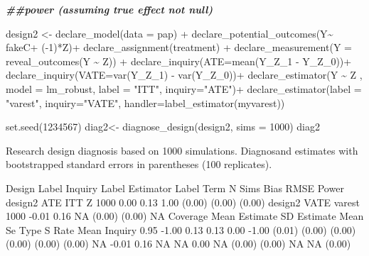 \documentclass[
  11pt,
]{article}
\newenvironment{Shaded}{\begin{snugshade}}{\end{snugshade}}
\newcommand{\AttributeTok}[1]{\textcolor[rgb]{0.77,0.63,0.00}{#1}}
\newcommand{\DecValTok}[1]{\textcolor[rgb]{0.00,0.00,0.81}{#1}}
\newcommand{\DocumentationTok}[1]{\textcolor[rgb]{0.56,0.35,0.01}{\textbf{\textit{#1}}}}
\newcommand{\FunctionTok}[1]{\textcolor[rgb]{0.00,0.00,0.00}{#1}}
\newcommand{\NormalTok}[1]{#1}
\newcommand{\OtherTok}[1]{\textcolor[rgb]{0.56,0.35,0.01}{#1}}
\newcommand{\SpecialCharTok}[1]{\textcolor[rgb]{0.00,0.00,0.00}{#1}}
\newcommand{\StringTok}[1]{\textcolor[rgb]{0.31,0.60,0.02}{#1}}
\begin{document}
\begin{Shaded}
\begin{Highlighting}[]
\DocumentationTok{\#\#power (assuming true effect not null)}

\NormalTok{design2  }\OtherTok{\textless{}{-}}
  \FunctionTok{declare\_model}\NormalTok{(}\AttributeTok{data =}\NormalTok{ pap) }\SpecialCharTok{+}
  \FunctionTok{declare\_potential\_outcomes}\NormalTok{(Y}\SpecialCharTok{\textasciitilde{}}\NormalTok{ fakeC}\SpecialCharTok{+}\NormalTok{ (}\SpecialCharTok{{-}}\DecValTok{1}\NormalTok{)}\SpecialCharTok{*}\NormalTok{Z)}\SpecialCharTok{+}
  \FunctionTok{declare\_assignment}\NormalTok{(treatment) }\SpecialCharTok{+} 
  \FunctionTok{declare\_measurement}\NormalTok{(}\AttributeTok{Y =} \FunctionTok{reveal\_outcomes}\NormalTok{(Y }\SpecialCharTok{\textasciitilde{}}\NormalTok{ Z)) }\SpecialCharTok{+}
  \FunctionTok{declare\_inquiry}\NormalTok{(}\AttributeTok{ATE=}\FunctionTok{mean}\NormalTok{(Y\_Z\_1 }\SpecialCharTok{{-}}\NormalTok{ Y\_Z\_0))}\SpecialCharTok{+}
  \FunctionTok{declare\_inquiry}\NormalTok{(}\AttributeTok{VATE=}\FunctionTok{var}\NormalTok{(Y\_Z\_1) }\SpecialCharTok{{-}} \FunctionTok{var}\NormalTok{(Y\_Z\_0))}\SpecialCharTok{+}
  \FunctionTok{declare\_estimator}\NormalTok{(Y }\SpecialCharTok{\textasciitilde{}}\NormalTok{ Z , }\AttributeTok{model =}\NormalTok{ lm\_robust, }\AttributeTok{label =} \StringTok{"ITT"}\NormalTok{, }\AttributeTok{inquiry=}\StringTok{"ATE"}\NormalTok{)}\SpecialCharTok{+}
  \FunctionTok{declare\_estimator}\NormalTok{(}\AttributeTok{label =} \StringTok{"varest"}\NormalTok{, }\AttributeTok{inquiry=}\StringTok{"VATE"}\NormalTok{, }\AttributeTok{handler=}\FunctionTok{label\_estimator}\NormalTok{(myvarest)) }

\FunctionTok{set.seed}\NormalTok{(}\DecValTok{1234567}\NormalTok{)}
\NormalTok{diag2}\OtherTok{\textless{}{-}} \FunctionTok{diagnose\_design}\NormalTok{(design2, }\AttributeTok{sims =} \DecValTok{1000}\NormalTok{)}
\NormalTok{diag2}
\end{Highlighting}
\end{Shaded}

Research design diagnosis based on 1000 simulations. Diagnosand
estimates with bootstrapped standard errors in parentheses (100
replicates).

Design Label Inquiry Label Estimator Label Term N Sims Bias RMSE Power
design2 ATE ITT Z 1000 0.00 0.13 1.00 (0.00) (0.00) (0.00) design2 VATE
varest 1000 -0.01 0.16 NA (0.00) (0.00) NA Coverage Mean Estimate SD
Estimate Mean Se Type S Rate Mean Inquiry 0.95 -1.00 0.13 0.13 0.00
-1.00 (0.01) (0.00) (0.00) (0.00) (0.00) (0.00) NA -0.01 0.16 NA NA 0.00
NA (0.00) (0.00) NA NA (0.00)
\end{document}
